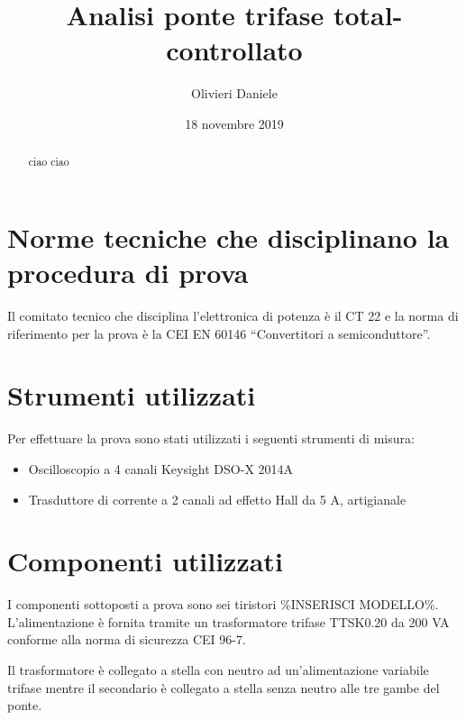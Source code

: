 \documentclass[a4paper,10pt]{article}
\title{Analisi ponte trifase total-controllato}
\author{Olivieri Daniele}
\date{18 novembre 2019}
\begin{document}
\maketitle

\begin{abstract}
 ciao ciao
\end{abstract}

\section{Norme tecniche che disciplinano la procedura di prova}
Il comitato tecnico che disciplina l'elettronica di potenza è il CT 22 e la norma
di riferimento per la prova è la CEI EN 60146 ``Convertitori a semiconduttore''.

\section{Strumenti utilizzati}
Per effettuare la prova sono stati utilizzati i seguenti strumenti di misura:
\begin{itemize}
 \item Oscilloscopio a 4 canali Keysight DSO-X 2014A
 \item Trasduttore di corrente a 2 canali ad effetto Hall da 5 A, artigianale
\end{itemize}

\section{Componenti utilizzati}
I componenti sottoposti a prova sono sei tiristori \%INSERISCI MODELLO\%.
L'alimentazione è fornita tramite un trasformatore trifase TTSK0.20 da 200 VA 
conforme alla norma di sicurezza CEI 96-7.

Il trasformatore è collegato a stella con neutro ad un'alimentazione variabile 
trifase mentre il secondario è collegato a stella senza neutro alle tre gambe del 
ponte.
\end{document}
